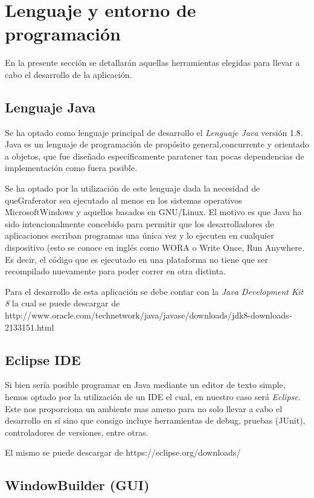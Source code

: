 \documentclass{book}
\begin{document}
\section{Lenguaje y entorno de programación}

En la presente sección se detallarán aquellas herramientas elegidas para llevar a cabo el desarrollo de la aplicación. 
\bigskip


\subsection{Lenguaje Java}

Se ha optado como lenguaje principal de desarrollo el \textit{Lenguaje Java} versión 1.8. Java es un lenguaje de programación de propósito general,concurrente y orientado a objetos, que fue diseñado específicamente paratener tan pocas dependencias de implementación como fuera posible.
\par
Se ha optado por la utilización de este lenguaje dada la necesidad de queGraferator sea ejecutado al menos en los sistemas operativos MicrosoftWindows y aquellos basados en GNU/Linux. El motivo es que Java ha sido intencionalmente concebido para permitir que los desarrolladores de  aplicaciones escriban programas una única vez y lo ejecuten en cualquier dispositivo (esto se conoce en inglés como WORA o Write Once, Run Anywhere. Es decir, el código que es ejecutado en una plataforma no tiene que ser recompilado nuevamente para poder correr en otra distinta.
\par
Para el desarrollo de esta aplicación se debe contar con la \textit{Java Development Kit 8} la cual se puede descargar de http://www.oracle.com/technetwork/java/javase/downloads/jdk8-downloads-2133151.html
\medskip


\subsection{Eclipse IDE}

Si bien sería posible programar en Java mediante un editor de texto simple, hemos optado por la utilización de un IDE el cual, en nuestro caso será \textit{Eclipse}. Este nos proporciona un ambiente mas ameno para no solo llevar a cabo el desarrollo en sí sino que consigo incluye herramientas de debug, pruebas (JUnit), controladores de versiones, entre otras.
\par
El mismo se puede descargar de https://eclipse.org/downloads/
\medskip


\subsection{WindowBuilder (GUI)}
\end{document}
